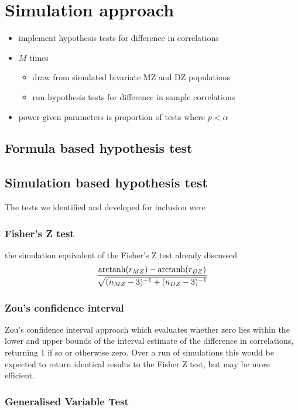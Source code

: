     \section{Simulation approach}
    \begin{itemize}
      \item implement hypothesis tests for difference in correlations
      \item $M$ times
        \begin{itemize}
          \item draw from simulated bivariate MZ and DZ populations
          \item run hypothesis tests for difference in sample correlations
        \end{itemize}
      \item power given parameters is proportion of tests where $p < \alpha$      
    \end{itemize} 
    
\subsection{Formula based hypothesis test}

\subsection{Simulation based hypothesis test}
The tests we identified and developed for inclusion were 

\subsubsection{Fisher's Z test}
the simulation equivalent of the Fisher's Z test already discussed
 $$\frac{\operatorname{arctanh}(r_{MZ}) - \operatorname{arctanh}(r_{DZ})}{\sqrt{(n_{MZ}-3)^{-1} + (n_{DZ}-3)^{-1}}}$$
\subsubsection{Zou's confidence interval}
Zou's confidence interval approach which evaluates whether zero lies within the lower and upper bounds of the interval estimate of the difference in correlations, returning 1 if so or otherwise zero.  Over a run of simulations this would be expected to return identical results to the Fisher Z test, but may be more efficient.

\subsubsection{Generalised Variable Test}

